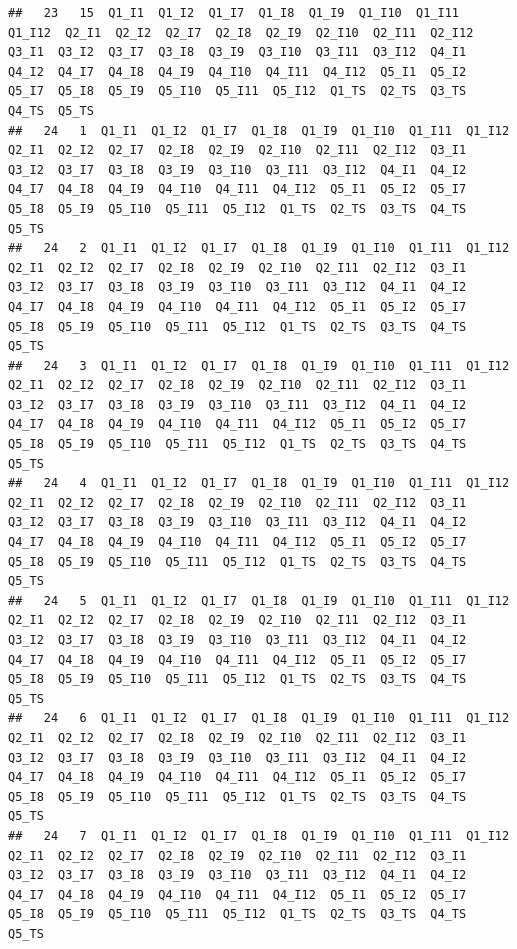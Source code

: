 \documentclass[]{book}
\begin{document}
\begin{verbatim}
##   23   15  Q1_I1  Q1_I2  Q1_I7  Q1_I8  Q1_I9  Q1_I10  Q1_I11  Q1_I12  Q2_I1  Q2_I2  Q2_I7  Q2_I8  Q2_I9  Q2_I10  Q2_I11  Q2_I12  Q3_I1  Q3_I2  Q3_I7  Q3_I8  Q3_I9  Q3_I10  Q3_I11  Q3_I12  Q4_I1  Q4_I2  Q4_I7  Q4_I8  Q4_I9  Q4_I10  Q4_I11  Q4_I12  Q5_I1  Q5_I2  Q5_I7  Q5_I8  Q5_I9  Q5_I10  Q5_I11  Q5_I12  Q1_TS  Q2_TS  Q3_TS  Q4_TS  Q5_TS
##   24   1  Q1_I1  Q1_I2  Q1_I7  Q1_I8  Q1_I9  Q1_I10  Q1_I11  Q1_I12  Q2_I1  Q2_I2  Q2_I7  Q2_I8  Q2_I9  Q2_I10  Q2_I11  Q2_I12  Q3_I1  Q3_I2  Q3_I7  Q3_I8  Q3_I9  Q3_I10  Q3_I11  Q3_I12  Q4_I1  Q4_I2  Q4_I7  Q4_I8  Q4_I9  Q4_I10  Q4_I11  Q4_I12  Q5_I1  Q5_I2  Q5_I7  Q5_I8  Q5_I9  Q5_I10  Q5_I11  Q5_I12  Q1_TS  Q2_TS  Q3_TS  Q4_TS  Q5_TS
##   24   2  Q1_I1  Q1_I2  Q1_I7  Q1_I8  Q1_I9  Q1_I10  Q1_I11  Q1_I12  Q2_I1  Q2_I2  Q2_I7  Q2_I8  Q2_I9  Q2_I10  Q2_I11  Q2_I12  Q3_I1  Q3_I2  Q3_I7  Q3_I8  Q3_I9  Q3_I10  Q3_I11  Q3_I12  Q4_I1  Q4_I2  Q4_I7  Q4_I8  Q4_I9  Q4_I10  Q4_I11  Q4_I12  Q5_I1  Q5_I2  Q5_I7  Q5_I8  Q5_I9  Q5_I10  Q5_I11  Q5_I12  Q1_TS  Q2_TS  Q3_TS  Q4_TS  Q5_TS
##   24   3  Q1_I1  Q1_I2  Q1_I7  Q1_I8  Q1_I9  Q1_I10  Q1_I11  Q1_I12  Q2_I1  Q2_I2  Q2_I7  Q2_I8  Q2_I9  Q2_I10  Q2_I11  Q2_I12  Q3_I1  Q3_I2  Q3_I7  Q3_I8  Q3_I9  Q3_I10  Q3_I11  Q3_I12  Q4_I1  Q4_I2  Q4_I7  Q4_I8  Q4_I9  Q4_I10  Q4_I11  Q4_I12  Q5_I1  Q5_I2  Q5_I7  Q5_I8  Q5_I9  Q5_I10  Q5_I11  Q5_I12  Q1_TS  Q2_TS  Q3_TS  Q4_TS  Q5_TS
##   24   4  Q1_I1  Q1_I2  Q1_I7  Q1_I8  Q1_I9  Q1_I10  Q1_I11  Q1_I12  Q2_I1  Q2_I2  Q2_I7  Q2_I8  Q2_I9  Q2_I10  Q2_I11  Q2_I12  Q3_I1  Q3_I2  Q3_I7  Q3_I8  Q3_I9  Q3_I10  Q3_I11  Q3_I12  Q4_I1  Q4_I2  Q4_I7  Q4_I8  Q4_I9  Q4_I10  Q4_I11  Q4_I12  Q5_I1  Q5_I2  Q5_I7  Q5_I8  Q5_I9  Q5_I10  Q5_I11  Q5_I12  Q1_TS  Q2_TS  Q3_TS  Q4_TS  Q5_TS
##   24   5  Q1_I1  Q1_I2  Q1_I7  Q1_I8  Q1_I9  Q1_I10  Q1_I11  Q1_I12  Q2_I1  Q2_I2  Q2_I7  Q2_I8  Q2_I9  Q2_I10  Q2_I11  Q2_I12  Q3_I1  Q3_I2  Q3_I7  Q3_I8  Q3_I9  Q3_I10  Q3_I11  Q3_I12  Q4_I1  Q4_I2  Q4_I7  Q4_I8  Q4_I9  Q4_I10  Q4_I11  Q4_I12  Q5_I1  Q5_I2  Q5_I7  Q5_I8  Q5_I9  Q5_I10  Q5_I11  Q5_I12  Q1_TS  Q2_TS  Q3_TS  Q4_TS  Q5_TS
##   24   6  Q1_I1  Q1_I2  Q1_I7  Q1_I8  Q1_I9  Q1_I10  Q1_I11  Q1_I12  Q2_I1  Q2_I2  Q2_I7  Q2_I8  Q2_I9  Q2_I10  Q2_I11  Q2_I12  Q3_I1  Q3_I2  Q3_I7  Q3_I8  Q3_I9  Q3_I10  Q3_I11  Q3_I12  Q4_I1  Q4_I2  Q4_I7  Q4_I8  Q4_I9  Q4_I10  Q4_I11  Q4_I12  Q5_I1  Q5_I2  Q5_I7  Q5_I8  Q5_I9  Q5_I10  Q5_I11  Q5_I12  Q1_TS  Q2_TS  Q3_TS  Q4_TS  Q5_TS
##   24   7  Q1_I1  Q1_I2  Q1_I7  Q1_I8  Q1_I9  Q1_I10  Q1_I11  Q1_I12  Q2_I1  Q2_I2  Q2_I7  Q2_I8  Q2_I9  Q2_I10  Q2_I11  Q2_I12  Q3_I1  Q3_I2  Q3_I7  Q3_I8  Q3_I9  Q3_I10  Q3_I11  Q3_I12  Q4_I1  Q4_I2  Q4_I7  Q4_I8  Q4_I9  Q4_I10  Q4_I11  Q4_I12  Q5_I1  Q5_I2  Q5_I7  Q5_I8  Q5_I9  Q5_I10  Q5_I11  Q5_I12  Q1_TS  Q2_TS  Q3_TS  Q4_TS  Q5_TS

\end{verbatim}
\end{document}

